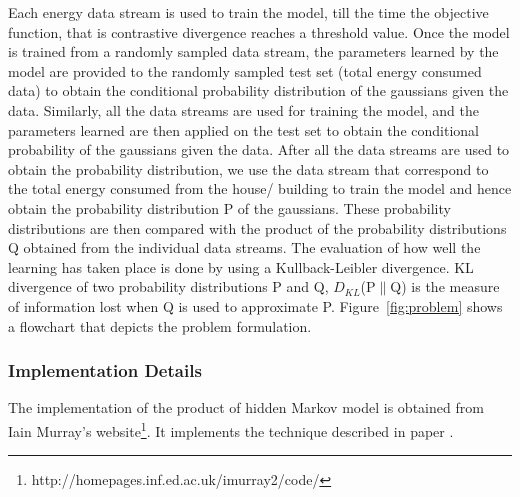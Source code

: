 \documentclass{acm_proc_article-sp}
\begin{document}
Each energy data stream is used to train the model, till the time the objective function, that is contrastive divergence reaches a threshold value. Once the model is trained from a randomly sampled data stream, the parameters learned by the model %
are provided to the randomly sampled test set (total energy consumed data) to obtain the conditional probability distribution of the gaussians given the data. Similarly, all the data streams are used for training the model, and the parameters learned are then applied on the test set to obtain the conditional probability of the gaussians given the data. After all the data streams are used to obtain the probability distribution, we use the data stream that correspond to the total energy consumed from the house/ building to train the model and hence obtain the probability distribution P of the gaussians. These probability distributions are then compared with the product of the probability distributions Q obtained from the individual data streams. The evaluation of how well the learning has taken place is done by using a Kullback-Leibler divergence. KL divergence of two probability distributions P and Q, $D_{KL}$(P$\parallel$Q) is the measure of information lost when Q is used to approximate P. Figure~\ref{fig:problem} shows a flowchart that depicts the problem formulation.
\subsubsection{Implementation Details}
The implementation of the product of hidden Markov model is obtained from Iain Murray's website\footnote{\label{link}http://homepages.inf.ed.ac.uk/imurray2/code/}. It implements the technique described in paper \cite{hinton2000}.
\end{document}
